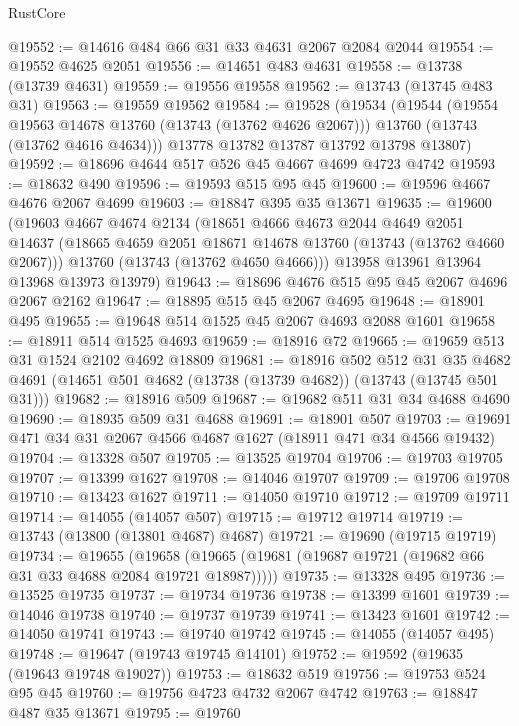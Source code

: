 \begin{lexlean}{RustCore}
\begin{coremodule}
@19552 := @14616 @484 @66 @31 @33 @4631 @2067 @2084 @2044
@19554 := @19552 @4625 @2051
@19556 := @14651 @483 @4631
@19558 := @13738 (@13739 @4631)
@19559 := @19556 @19558
@19562 := @13743 (@13745 @483 @31)
@19563 := @19559 @19562
@19584 := @19528
    (@19534
      (@19544
        (@19554 @19563 @14678 @13760 (@13743 (@13762 @4626 @2067)))
        @13760
        (@13743 (@13762 @4616 @4634)))
      @13778
      @13782
      @13787
      @13792
      @13798
      @13807)
@19592 := @18696 @4644 @517 @526 @45 @4667 @4699 @4723 @4742
@19593 := @18632 @490
@19596 := @19593 @515 @95 @45
@19600 := @19596 @4667 @4676 @2067 @4699
@19603 := @18847 @395 @35 @13671
@19635 := @19600
    (@19603
      @4667
      @4674
      @2134
      (@18651
        @4666
        @4673
        @2044
        @4649
        @2051
        @14637
        (@18665 @4659 @2051 @18671 @14678 @13760 (@13743 (@13762 @4660 @2067)))
        @13760
        (@13743 (@13762 @4650 @4666)))
      @13958
      @13961
      @13964
      @13968
      @13973
      @13979)
@19643 := @18696 @4676 @515 @95 @45 @2067 @4696 @2067 @2162
@19647 := @18895 @515 @45 @2067 @4695
@19648 := @18901 @495
@19655 := @19648 @514 @1525 @45 @2067 @4693 @2088 @1601
@19658 := @18911 @514 @1525 @4693
@19659 := @18916 @72
@19665 := @19659 @513 @31 @1524 @2102 @4692 @18809
@19681 := @18916
    @502
    @512
    @31
    @35
    @4682
    @4691
    (@14651 @501 @4682 (@13738 (@13739 @4682)) (@13743 (@13745 @501 @31)))
@19682 := @18916 @509
@19687 := @19682 @511 @31 @34 @4688 @4690
@19690 := @18935 @509 @31 @4688
@19691 := @18901 @507
@19703 := @19691 @471 @34 @31 @2067 @4566 @4687 @1627 (@18911 @471 @34 @4566 @19432)
@19704 := @13328 @507
@19705 := @13525 @19704
@19706 := @19703 @19705
@19707 := @13399 @1627
@19708 := @14046 @19707
@19709 := @19706 @19708
@19710 := @13423 @1627
@19711 := @14050 @19710
@19712 := @19709 @19711
@19714 := @14055 (@14057 @507)
@19715 := @19712 @19714
@19719 := @13743 (@13800 (@13801 @4687) @4687)
@19721 := @19690 (@19715 @19719)
@19734 := @19655
    (@19658 (@19665 (@19681 (@19687 @19721 (@19682 @66 @31 @33 @4688 @2084 @19721 @18987)))))
@19735 := @13328 @495
@19736 := @13525 @19735
@19737 := @19734 @19736
@19738 := @13399 @1601
@19739 := @14046 @19738
@19740 := @19737 @19739
@19741 := @13423 @1601
@19742 := @14050 @19741
@19743 := @19740 @19742
@19745 := @14055 (@14057 @495)
@19748 := @19647 (@19743 @19745 @14101)
@19752 := @19592 (@19635 (@19643 @19748 @19027))
@19753 := @18632 @519
@19756 := @19753 @524 @95 @45
@19760 := @19756 @4723 @4732 @2067 @4742
@19763 := @18847 @487 @35 @13671
@19795 := @19760

\end{coremodule}
\end{lexlean}
